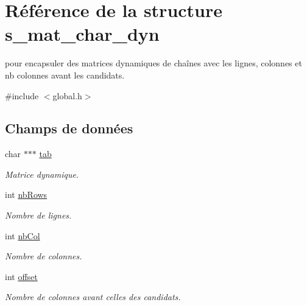 \hypertarget{structs__mat__char__dyn}{}\section{Référence de la structure s\+\_\+mat\+\_\+char\+\_\+dyn}
\label{structs__mat__char__dyn}


pour encapsuler des matrices dynamiques de chaînes avec les lignes, colonnes et nb colonnes avant les candidats.  




{\ttfamily \#include $<$global.\+h$>$}

\subsection*{Champs de données}
\begin{DoxyCompactItemize}
\item 
\mbox{\label{structs__mat__char__dyn_aed543834b9d320f54b8e095f2bcb254c}} 
char $\ast$$\ast$$\ast$ \hyperlink{structs__mat__char__dyn_aed543834b9d320f54b8e095f2bcb254c}{tab}
\begin{DoxyCompactList}\small\item\em Matrice dynamique. \end{DoxyCompactList}\item 
\mbox{\label{structs__mat__char__dyn_a79216b74e382c29c63ee9be03b8eda5f}} 
int \hyperlink{structs__mat__char__dyn_a79216b74e382c29c63ee9be03b8eda5f}{nb\+Rows}
\begin{DoxyCompactList}\small\item\em Nombre de lignes. \end{DoxyCompactList}\item 
\mbox{\label{structs__mat__char__dyn_a6469383d7383132548299002f54d4524}} 
int \hyperlink{structs__mat__char__dyn_a6469383d7383132548299002f54d4524}{nb\+Col}
\begin{DoxyCompactList}\small\item\em Nombre de colonnes. \end{DoxyCompactList}\item 
\mbox{\label{structs__mat__char__dyn_aed7ea92f45bd273dde380a45ddced592}} 
int \hyperlink{structs__mat__char__dyn_aed7ea92f45bd273dde380a45ddced592}{offset}
\begin{DoxyCompactList}\small\item\em Nombre de colonnes avant celles des candidats. \end{DoxyCompactList}\end{DoxyCompactItemize}


